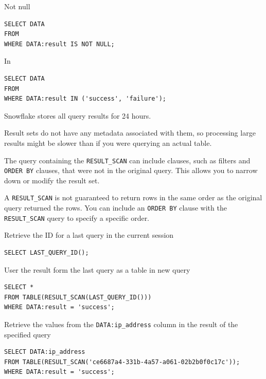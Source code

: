 \documentclass[9pt]{innovativeinnovation-cheatsheet}
\begin{document}
\begin{multicols}{3}
Not null
\\[-18pt]
\begin{lstlisting}[style=code_style]
SELECT DATA
FROM
WHERE DATA:result IS NOT NULL;
\end{lstlisting}

In
\\[-18pt]
\begin{lstlisting}[style=code_style]
SELECT DATA
FROM
WHERE DATA:result IN ('success', 'failure');
\end{lstlisting}

\vspace{-18pt}
\be{}
\item Snowflake stores all query results for 24 hours.
\item Result sets do not have any metadata associated with them, so processing large results might be slower than if you were querying an actual table.
\item The query containing the \texttt{RESULT\_SCAN} can include clauses, such as filters and \texttt{ORDER BY} clauses, that were not in the original query. This allows you to narrow down or modify the result set.
\item A \texttt{RESULT\_SCAN} is not guaranteed to return rows in the same order as the original query returned the rows. You can include an \texttt{ORDER BY} clause with the \texttt{RESULT\_SCAN} query to specify a specific order.
\ee{}

Retrieve the ID for a last query in the current session
\\[-18pt]
\begin{lstlisting}[style=code_style]
SELECT LAST_QUERY_ID();
\end{lstlisting}

User the result form the last query as a table in new query
\\[-18pt]
\begin{lstlisting}[style=code_style]
SELECT * 
FROM TABLE(RESULT_SCAN(LAST_QUERY_ID())) 
WHERE DATA:result = 'success';
\end{lstlisting}

Retrieve the values from the \texttt{DATA:ip\_address} column in the result of the specified query
\\[-18pt]
\begin{lstlisting}[style=code_style]
SELECT DATA:ip_address
FROM TABLE(RESULT_SCAN('ce6687a4-331b-4a57-a061-02b2b0f0c17c'));
WHERE DATA:result = 'success';
\end{lstlisting}


\end{multicols}
\end{document}
